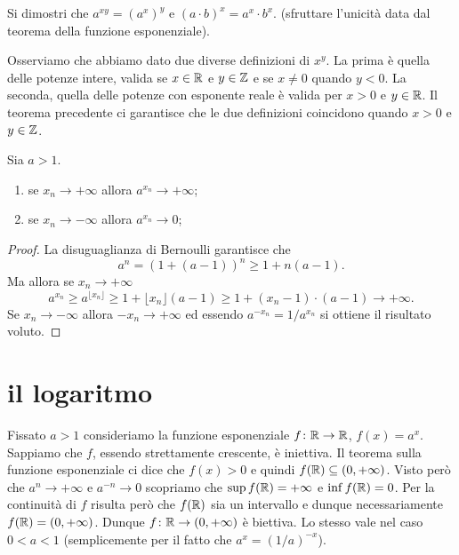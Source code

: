 \begin{exercise}
Si dimostri che $a^{xy} = (a^x)^y$
e $(a\cdot b)^x = a^x \cdot b^x$.
(sfruttare l'unicità data dal teorema della funzione esponenziale).
\end{exercise}

Osserviamo che abbiamo dato due diverse definizioni di $x^y$.
La prima è quella delle potenze intere, valida se $x\in \mathbb R$ e $y\in \mathbb Z$
e se $x\neq 0$ quando $y<0$. La seconda, quella delle potenze con esponente
reale è valida per $x>0$ e $y\in \mathbb R$. Il teorema precedente ci garantisce
che le due definizioni coincidono quando $x>0$ e $y\in \mathbb Z$.

\begin{theorem}
\label{th:limite_esponenziale}
Sia $a>1$.
\begin{enumerate}
\item se $x_n \to +\infty$ allora $a^{x_n} \to +\infty$;
\item se $x_n \to -\infty$ allora $a^{x_n} \to 0$;
\end{enumerate}
\end{theorem}
%
\begin{proof}
La disuguaglianza di Bernoulli garantisce che
\[
  a^n = (1+(a-1))^n \ge 1 + n(a-1).
\]
Ma allora se $x_n \to +\infty$
\[
  a^{x_n} \ge a^{\lfloor x_n \rfloor} \ge 1 + \lfloor x_n \rfloor (a-1)
  \ge 1 + (x_n-1)\cdot(a-1)
  \to +\infty.
\]
Se $x_n \to -\infty$ allora $-x_n \to +\infty$ ed essendo
$a^{-x_n} = 1/ a^{x_n}$ si ottiene il risultato voluto.
\end{proof}

\section{il logaritmo}

Fissato $a>1$ consideriamo la funzione esponenziale
$f\colon \mathbb R \to \mathbb R$, $f(x) = a^x$.
Sappiamo che $f$, essendo strettamente crescente, è iniettiva.
Il teorema sulla funzione esponenziale ci dice che $f(x)>0$ e quindi
$f(\mathbb R) \subseteq (0,+\infty)$.
Visto però che $a^n\to +\infty$ e $a^{-n} \to 0$ scopriamo che
$\sup f(\mathbb R)=+\infty$ e $\inf f(\mathbb R)=0$.
Per la continuità di $f$ risulta però che $f(\mathbb R)$ sia un intervallo
e dunque necessariamente $f(\mathbb R) = (0,+\infty)$.
Dunque $f\colon \mathbb R \to (0,+\infty)$ è biettiva.
Lo stesso vale nel caso $0<a<1$ (semplicemente per il fatto che $a^x = (1/a)^{-x}$).

